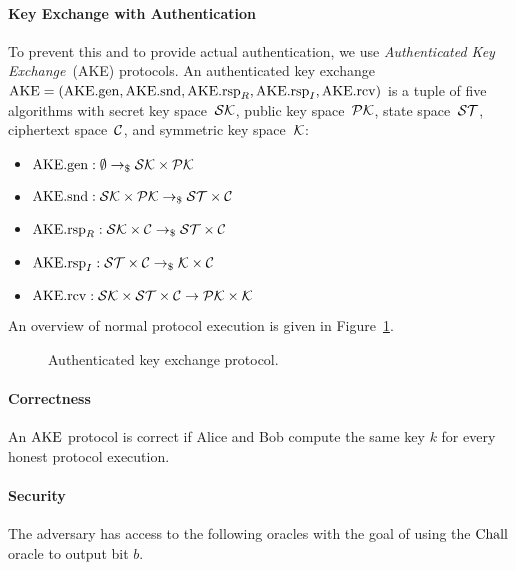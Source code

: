\paragraph{Key Exchange with Authentication} To prevent this and to provide actual authentication, we use \emph{Authenticated Key Exchange}~(AKE) protocols.
An authenticated key exchange $\mathrm{AKE}=(\mathrm{AKE}.\mathrm{gen},\allowbreak\mathrm{AKE}.\mathrm{snd},\allowbreak\mathrm{AKE}.\mathrm{rsp}_R,\allowbreak\mathrm{AKE}.\mathrm{rsp}_I,\allowbreak\mathrm{AKE}.\mathrm{rcv})$ is a tuple of five algorithms with secret key space~$\mathcal{SK}$, public key space~$\mathcal{PK}$, state space~$\mathcal{ST}$, ciphertext space~$\mathcal{C}$, and symmetric key space~$\mathcal{K}$:
\begin{itemize}
    \item $\mathrm{AKE}.\mathrm{gen}: \emptyset \to_\$ \mathcal{SK}\times\mathcal{PK}$
    \item $\mathrm{AKE}.\mathrm{snd}: \mathcal{SK}\times\mathcal{PK} \to_\$ \mathcal{ST}\times\mathcal{C}$
    \item $\mathrm{AKE}.\mathrm{rsp}_R: \mathcal{SK}\times\mathcal{C} \to_\$ \mathcal{ST}\times\mathcal{C}$
    \item $\mathrm{AKE}.\mathrm{rsp}_I: \mathcal{ST}\times\mathcal{C} \to_\$ \mathcal{K}\times\mathcal{C}$
    \item $\mathrm{AKE}.\mathrm{rcv}: \mathcal{SK}\times\mathcal{ST}\times\mathcal{C} \to \mathcal{PK}\times\mathcal{K}$
\end{itemize}

An overview of normal protocol execution is given in Figure~\ref{fig:ake:overview}. 

\begin{figure}[!ht]
    \centering
    
    \caption{Authenticated key exchange protocol.}
    \label{fig:ake:overview}
\end{figure}

\paragraph{Correctness} An $\mathrm{AKE}$ protocol is correct if Alice and Bob compute the same key $k$ for every honest protocol execution.

\paragraph{Security} The adversary has access to the following oracles with the goal of using the $\mathrm{Chall}$ oracle to output bit $b$.

